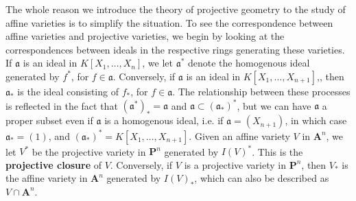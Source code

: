 The whole reason we introduce the theory of projective geometry to the study of affine varieties is to simplify the situation. To see the correspondence between affine varieties and projective varieties, we begin by looking at the correspondences between ideals in the respective rings generating these varieties. If $\mathfrak{a}$ is an ideal in $K[X_1, \dots, X_n]$, we let $\mathfrak{a}^*$ denote the homogenous ideal generated by $f^*$, for $f \in \mathfrak{a}$. Conversely,  if $\mathfrak{a}$ is an ideal in $K[X_1, \dots, X_{n+1}]$,, then $\mathfrak{a}_*$ is the ideal consisting of $f_*$, for $f \in \mathfrak{a}$. The relationship between these processes is reflected in the fact that $(\mathfrak{a}^*)_* = \mathfrak{a}$ and $\mathfrak{a} \subset (\mathfrak{a}_*)^*$, but we can have $\mathfrak{a}$ a proper subset even if $\mathfrak{a}$ is a homogenous ideal, i.e. if $\mathfrak{a} = (X_{n+1})$, in which case $\mathfrak{a}_* = (1)$, and $(\mathfrak{a}_*)^* = K[X_1, \dots, X_{n+1}]$. Given an affine variety $V$ in $\mathbf{A}^n$, we let $V^*$ be the projective variety in $\mathbf{P}^n$ generated by $I(V)^*$. This is the {\bf projective closure} of $V$. Conversely, if $V$ is a projective variety in $\mathbf{P}^n$, then $V_*$ is the affine variety in $\mathbf{A}^n$ generated by $I(V)_*$, which can also be described as $V \cap \mathbf{A}^n$.

